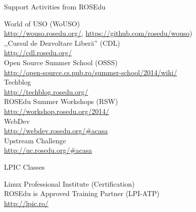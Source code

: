 \documentclass{simple}
\begin{document}
\begin{frame}{Support Activities from ROSEdu}
  \begin{center}
    {\small
      \pause World of USO (WoUSO) \\
      \url{http://wouso.rosedu.org/}, \url{https://github.com/rosedu/wouso}) \\
      \vspace{0.3cm}
      \pause ,,Cursul de Dezvoltare Liberă'' (CDL) \\
      \url{http://cdl.rosedu.org/} \\
      \vspace{0.3cm}
      \pause Open Source Summer School (OSSS) \\
      \url{http://open-source.cs.pub.ro/summer-school/2014/wiki/} \\
      \vspace{0.3cm}
      \pause Techblog \\
      \url{http://techblog.rosedu.org/} \\
      \vspace{0.3cm}
      \pause ROSEdu Summer Workshops (RSW) \\
      \url{http://workshop.rosedu.org/2014/} \\
      \vspace{0.3cm}
      \pause WebDev \\
      \url{http://webdev.rosedu.org/\#acasa} \\
      \vspace{0.3cm}
      \pause Upstream Challenge \\
      \url{http://uc.rosedu.org/\#acasa}
    }
  \end{center}
\end{frame}

\begin{frame}{LPIC Classes}
  \begin{center}
    {\Large
      \pause Linux Professional Institute (Certification) \\
      \vspace{0.3cm}
      \pause ROSEdu is Approved Training Partner (LPI-ATP) \\
      \vspace{0.3cm}
      \pause \url{http://lpic.ro/}
    }
  \end{center}
\end{frame}
\end{document}
